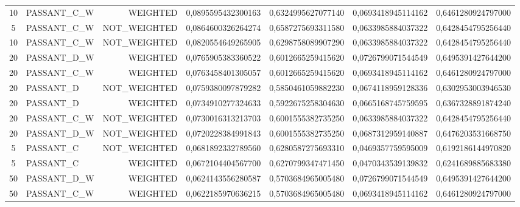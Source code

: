 \begin{table}[H]
{\begin{tabular}{ c l r c c c c }
				10 & PASSANT\_C\_W &   WEIGHTED & 0,0895595432300163 & 0,6324995627077140 & 0,0693418945114162 & 0,6461280924797000 \\
				
				5 & PASSANT\_C\_W & NOT\_WEIGHTED & 0,0864600326264274 & 0,6587275693311580 & 0,0633985884037322 & 0,6428454795256440 \\
				
				10 & PASSANT\_C\_W & NOT\_WEIGHTED & 0,0820554649265905 & 0,6298758089907290 & 0,0633985884037322 & 0,6428454795256440 \\
				
				20 & PASSANT\_D\_W &   WEIGHTED & 0,0765905383360522 & 0,6012665259415620 & 0,0726799071544549 & 0,6495391427644200 \\
				
				20 & PASSANT\_C\_W &   WEIGHTED & 0,0763458401305057 & 0,6012665259415620 & 0,0693418945114162 & 0,6461280924797000 \\
				
				20 &  PASSANT\_D & NOT\_WEIGHTED & 0,0759380097879282 & 0,5850461059882230 & 0,0674118959128336 & 0,6302953003946530 \\
				
				20 &  PASSANT\_D &   WEIGHTED & 0,0734910277324633 & 0,5922675258304630 & 0,0665168745759595 & 0,6367328891874240 \\
				
				20 & PASSANT\_C\_W & NOT\_WEIGHTED & 0,0730016313213703 & 0,6001555382735250 & 0,0633985884037322 & 0,6428454795256440 \\
				
				20 & PASSANT\_D\_W & NOT\_WEIGHTED & 0,0720228384991843 & 0,6001555382735250 & 0,0687312959140887 & 0,6476203531668750 \\
				
				5 &  PASSANT\_C & NOT\_WEIGHTED & 0,0681892332789560 & 0,6280587275693310 & 0,0469357759595009 & 0,6192186144970820 \\
				
				5 &  PASSANT\_C &   WEIGHTED & 0,0672104404567700 & 0,6270799347471450 & 0,0470343539139832 & 0,6241689885683380 \\
				
				50 & PASSANT\_D\_W &   WEIGHTED & 0,0624143556280587 & 0,5703684965005480 & 0,0726799071544549 & 0,6495391427644200 \\
				
				50 & PASSANT\_C\_W &   WEIGHTED & 0,0622185970636215 & 0,5703684965005480 & 0,0693418945114162 & 0,6461280924797000 \\
				

\end{tabular}}
\end{table}
